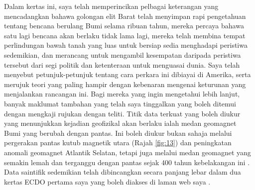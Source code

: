 \documentclass[10pt,twocolumn,letterpaper]{article}
\begin{document}
Dalam kertas ini, saya telah memperincikan pelbagai keterangan yang mencadangkan bahawa golongan elit Barat telah menyimpan rapi pengetahuan tentang bencana berulang Bumi selama ribuan tahun, mereka percaya bahawa satu lagi bencana akan berlaku tidak lama lagi, mereka telah membina tempat perlindungan bawah tanah yang luas untuk bersiap sedia menghadapi peristiwa sedemikian, dan merancang untuk mengambil kesempatan daripada peristiwa tersebut dari segi politik dan ketenteraan untuk menguasai dunia. Saya telah menyebut petunjuk-petunjuk tentang cara perkara ini dibiayai di Amerika, serta merujuk teori yang paling hampir dengan kebenaran mengenai keturunan yang menjalankan rancangan ini. Bagi mereka yang ingin mengetahui lebih lanjut, banyak maklumat tambahan yang telah saya tinggalkan yang boleh ditemui dengan mengkaji rujukan dengan teliti.
Titik data terkuat yang boleh diukur yang menunjukkan kejadian geofizikal akan berlaku ialah medan geomagnet Bumi yang berubah dengan pantas. Ini boleh diukur bukan sahaja melalui pergerakan pantas kutub magnetik utara (Rajah \ref{fig:13}) dan peningkatan anomali geomagnet Atlantik Selatan, tetapi juga melalui medan geomagnet yang semakin lemah dan terganggu dengan pantas sejak 400 tahun kebelakangan ini \cite{3}. Data saintifik sedemikian telah dibincangkan secara panjang lebar dalam dua kertas ECDO pertama saya yang boleh diakses di laman web saya \cite{3}.
\end{document}
